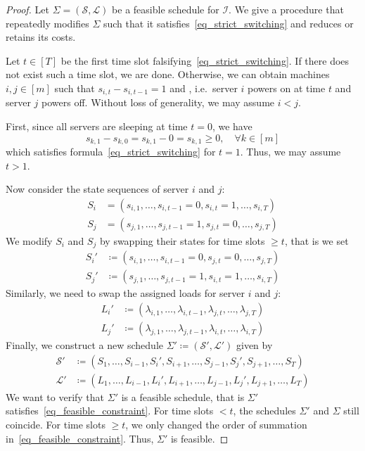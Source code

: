 \documentclass[hidelinks]{article}
\theoremstyle{plain}
\theoremstyle{definition}
\theoremstyle{rem}
\newcommand{\inp}{\mathcal{I}}
\begin{document}
\begin{proof}
Let $\Sigma=(\mathcal{S},\mathcal{L})$ be a feasible schedule for $\inp$. We give a procedure that repeatedly modifies $\Sigma$ such that it satisfies~\eqref{eq_strict_switching} and reduces or retains its costs. 
	
Let $t\in[T]$ be the first time slot falsifying~\eqref{eq_strict_switching}. If there does not exist such a time slot, we are done. Otherwise, we can obtain machines $i,j\in[m]$ such that $s_{i,t}-s_{i,t-1}=1$ and , i.e.\ server $i$ powers on at time $t$ and server $j$ powers off. Without loss of generality, we may assume $i<j$. 
	
First, since all servers are sleeping at time $t=0$, we have
\begin{equation*}
	s_{k,1}-s_{k,0}=s_{k,1}-0=s_{k,1}\ge 0,\quad\forall k\in[m]
\end{equation*}
which satisfies formula~\eqref{eq_strict_switching} for $t=1$.
Thus, we may assume $t>1$. 
	
Now consider the state sequences of server $i$ and $j$:
\begin{align*}
	S_i&=(s_{i,1},\ldots,s_{i,t-1}=0,s_{i,t}=1,\ldots,s_{i,T})\\
	S_j&=(s_{j,1},\ldots,s_{j,t-1}=1,s_{j,t}=0,\ldots,s_{j,T})
\end{align*}
We modify $S_i$ and $S_j$ by swapping their states for time slots $\ge t$, that is we set
\begin{align*}
	S_i'&\coloneqq(s_{i,1},\ldots,s_{i,t-1}=0,s_{j,t}=0,\ldots,s_{j,T})\\
	S_j'&\coloneqq(s_{j,1},\ldots,s_{j,t-1}=1,s_{i,t}=1,\ldots,s_{i,T})
\end{align*}
Similarly, we need to swap the assigned loads for server $i$ and $j$:
\begin{align*}
	L_i'&\coloneqq(\lambda_{i,1},\ldots,\lambda_{i,t-1},\lambda_{j,t},\ldots,\lambda_{j,T})\\
	L_j'&\coloneqq(\lambda_{j,1},\ldots,\lambda_{j,t-1},\lambda_{i,t},\ldots,\lambda_{i,T})
\end{align*}
Finally, we construct a new schedule $\Sigma'\coloneqq(\mathcal{S}',\mathcal{L}')$ given by 
\begin{align*}
	\mathcal{S}'&\coloneqq(S_1,\ldots,S_{i-1},S_i',S_{i+1},\ldots,S_{j-1},S_j',S_{j+1},\ldots,S_T)\\
	\mathcal{L}'&\coloneqq(L_1,\ldots,L_{i-1},L_i',L_{i+1},\ldots,L_{j-1},L_j',L_{j+1},\ldots,L_T)
\end{align*}
We want to verify that $\Sigma'$ is a feasible schedule, that is $\Sigma'$ satisfies~\eqref{eq_feasible_constraint}. For time slots $<t$, the schedules $\Sigma'$ and $\Sigma$ still coincide. For time slots $\ge t$, we only changed the order of summation in~\eqref{eq_feasible_constraint}. Thus, $\Sigma'$ is feasible.


\end{proof}
\end{document}

